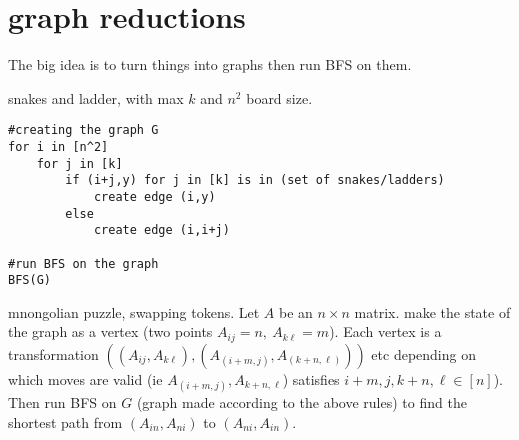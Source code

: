 \section{graph reductions} 
The big idea is to turn things into graphs then run BFS on them.
\begin{example}
snakes and ladder, with max $k$ and $n^2$ board size.
\begin{verbatim}
#creating the graph G
for i in [n^2]
    for j in [k] 
        if (i+j,y) for j in [k] is in (set of snakes/ladders)
            create edge (i,y)
        else
            create edge (i,i+j) 

#run BFS on the graph
BFS(G)
\end{verbatim}
\end{example}
\begin{example}
    mnongolian puzzle, swapping tokens. Let $A$ be an $n \times n$ matrix. make the state of the graph as a vertex (two points  $A_{ij}=n,\ A_{k\ell}=m$). Each vertex is a transformation $((A_{ij},A_{k\ell}),(A_{(i+m,j)},A_{(k+n,\ell)}))$ etc depending on which moves are valid (ie $A_{(i+m,j)},A_{k+n,\ell}$) satisfies $i+m,j,k+n,\ell \in [n]$). Then run BFS on $G$ (graph made according to the above rules) to find the shortest path from $(A_{in},A_{ni})$ to $(A_{ni},A_{in})$.
\end{example}

